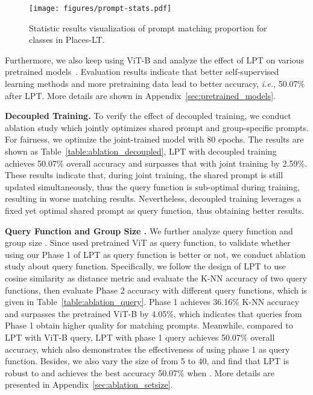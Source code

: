 \documentclass{article} \usepackage{iclr2023_conference,times}
\begin{document}
\begin{figure}
\begin{center}
\texttt{[image: figures/prompt-stats.pdf]}
\end{center}
\vspace{-0.7em}
\caption{Statistic results visualization of prompt matching proportion for classes in Places-LT. 
}
\vspace{-1em}
\label{fig:prompt_stats}
\end{figure}
Furthermore, we also keep using ViT-B and analyze the effect of LPT on various pretrained models~\citep{pmlr-v139-touvron21a,caron2021emerging,zhou2022mugs,dosovitskiy2021an}.
Evaluation results indicate that better self-supervised learning methods and more pretraining data lead to better accuracy, \textit{i.e.}, 50.07\% after LPT. More details are shown in Appendix~\ref{sec:pretrained_models}.

\textbf{Decoupled Training. }
To verify the effect of decoupled training, we conduct ablation study which jointly optimizes shared prompt and group-specific prompts. For fairness, we optimize the joint-trained model with 80 epochs. The results are shown as Table~\ref{table:ablation_decoupled}, LPT with decoupled training achieves 50.07\% overall accuracy and surpasses that with joint training by 2.59\%. 
These results indicate that, during joint training, the shared prompt is still updated simultaneously, thus the query function is sub-optimal during training, resulting in worse matching results. Nevertheless, decoupled training leverages a fixed yet optimal shared prompt as query function, thus obtaining better results.

\textbf{Query Function and Group Size . }
We further analyze query function and group size .
Since \citet{wang2022learning} used pretrained ViT as query function, to validate whether using our Phase 1 of LPT as query function is better or not, we conduct ablation study about query function. Specifically, we follow the design of LPT to use cosine similarity as distance metric and evaluate the K-NN accuracy of two query functions, then evaluate Phase 2 accuracy with different query functions, which is given in Table~\ref{table:ablation_query}. Phase 1 achieves 36.16\% K-NN accuracy and surpasses the pretrained ViT-B by 4.05\%, which indicates that queries from Phase 1 obtain higher quality for matching prompts. Meanwhile, compared to LPT with ViT-B query, LPT with phase 1 query achieves 50.07\% overall accuracy, which also demonstrates the effectiveness of using phase 1 as query function. Besides, we also vary the size of   from 5 to 40, and find that LPT is robust to  and achieves the best accuracy 50.07\% when . 
More details are presented in Appendix~\ref{sec:ablation_setsize}.
\end{document}
